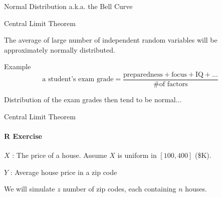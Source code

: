 \documentclass{beamer}\usepackage[]{graphicx}\usepackage[]{color}
\begin{document}
\begin{darkframes}
\begin{frame}[label=lists]{Normal Distribution a.k.a. the Bell Curve}
		
   			
	\end{frame}
	
	
	
	
	
	\begin{frame}[label=lists]{Central Limit Theorem}
		\begin{definition}
			The average of large number of independent random variables will be approximately normally distributed.
		\end{definition}		 \pause
		
		\begin{exampleblock}{Example}
			$$
				\text{a student's exam grade} = \frac{  \text{preparedness} + \text{focus} + \text{IQ} + \ldots  }{ \text{\# of factors}}
			$$
		\end{exampleblock} \pause
		
		Distribution of the exam grades then tend to be normal...

   			
	\end{frame}	
	
	
	
	
	
	
	
	
	\begin{frame}[label=lists]{Central Limit Theorem}
		\framesubtitle{R Exercise} 
		 $X$ : The price of a house. Assume $X$ is uniform in $[100,400]$ (\$K).  \pause
		 
		 $Y$ : Average house price in a zip code  \pause
		 
		 We will simulate $z$ number of zip codes, each containing $n$ houses.	\pause 	
		
		
		\housePrices
   			
	\end{frame}	










\end{darkframes}
  
  
  
\end{document}
